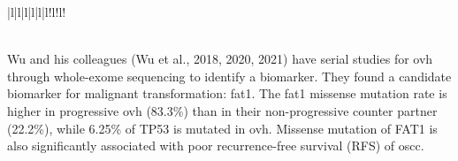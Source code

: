 \documentclass[12pt, a4paper]{article}
\newcommand{\comm}[1]{} %
\begin{document}
{\begin{table}[!hp]
{\begin{tabular}{|l|l|l|l|l|l!{\color{black}\vrule}l!{\color{black}\vrule}l!{\color{black}\vrule}}
                                                                                                                                                                                                                                                                                                                                                                                                                                                                                                \\ 
\hline
{}                                                                                                                                                                                                                                                                                                                                                                                                    \\
\hline
\end{tabular}
}%
{}
\label{table:table4}
\end{table}

} %



Wu and his colleagues (Wu et al., 2018, 2020, 2021) have serial studies for \acrshort{ovh} through whole-exome sequencing to identify a biomarker. 
They found a candidate biomarker for malignant transformation: \acrfull{fat1}.
The \acrshort{fat1} missense mutation rate is higher in progressive \acrshort{ovh} (83.3\%) than in their non-progressive counter partner (22.2\%), while 6.25\% of TP53 is mutated in \acrshort{ovh}. 
Missense mutation of FAT1 is also significantly associated with poor recurrence-free survival (RFS) of \acrshort{oscc}.

\end{document}
